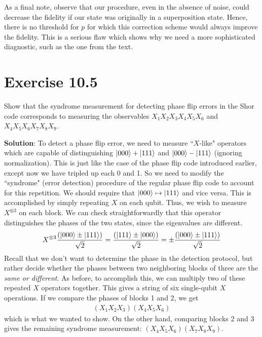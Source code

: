 \documentclass{book}
\begin{document}
    As a final note, observe that our procedure, even in the absence of noise, could decrease the fidelity if our state was originally in a superposition state. Hence, there is no threshold for $p$ for which this correction scheme would always improve the fidelity. This is a serious flaw which shows why we need a more sophisticated diagnostic, such as the one from the text.
    
\section*{Exercise 10.5}
    Show that the syndrome measurement for detecting phase flip errors in the Shor code corresponds to measuring the observables $X_1 X_2 X_3 X_4 X_5 X_6$ and $X_4 X_5 X_6 X_7 X_8 X_9$.
    
    \textbf{Solution}: To detect a phase flip error, we need to measure ``$X$-like" operators which are capable of distinguishing $\ket{000} + \ket{111}$ and $\ket{000} - \ket{111}$ (ignoring normalization). This is just like the case of the phase flip code introduced earlier, except now we have tripled up each 0 and 1. So we need to modify the ``syndrome" (error detection) procedure of the regular phase flip code to account for this repetition. We should require that $\ket{000} \mapsto \ket{111}$ and vice versa. This is accomplished by simply repeating $X$ on each qubit. Thus, we wish to measure $X^{\otimes 3}$ on each block. We can check straightforwardly that this operator distinguishes the phases of the two states, since the eigenvalues are different.
    \begin{align}
        X^{\otimes 3} \frac{ \left(\ket{000} \pm \ket{111}\right)}{\sqrt{2}} = \frac{\left(\ket{111} \pm \ket{000}\right)}{\sqrt{2}} = \pm \frac{ \left(\ket{000} \pm \ket{111}\right)}{\sqrt{2}}
    \end{align}
    Recall that we don't want to determine the phase in the detection protocol, but rather decide whether the phases between two neighboring blocks of three are the \emph{same or different}. As before, to accomplish this, we can multiply two of these repeated $X$ operators together. This gives a string of six single-qubit $X$ operations. If we compare the phases of blocks 1 and 2, we get
    \begin{align}
        (X_1 X_2 X_3) (X_4 X_5 X_6)
    \end{align}
    which is what we wanted to show. On the other hand, comparing blocks 2 and 3 gives the remaining syndrome measurement: $(X_4 X_5 X_6) (X_7 X_8 X_9)$.
\end{document}

